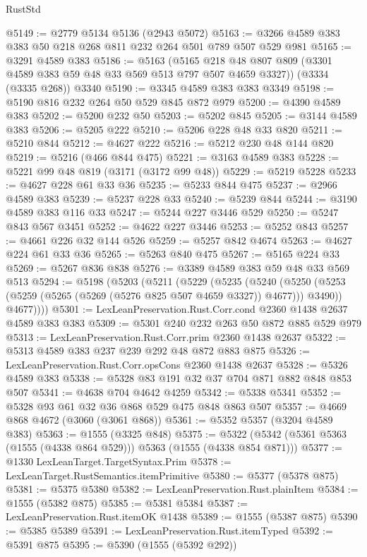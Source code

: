 \begin{lexlean}{RustStd}
\begin{coremodule}
@5149 := @2779 @5134 @5136 (@2943 @5072)
@5163 := @3266 @4589 @383 @383 @50 @218 @268 @811 @232 @264 @501 @789 @507 @529 @981
@5165 := @3291 @4589 @383
@5186 := @5163
    (@5165 @218 @48 @807 @809 (@3301 @4589 @383 @59 @48 @33 @569 @513 @797 @507 @4659 @3327))
    (@3334 (@3335 @268))
    @3340
@5190 := @3345 @4589 @383 @383 @3349
@5198 := @5190 @816 @232 @264 @50 @529 @845 @872 @979
@5200 := @4390 @4589 @383
@5202 := @5200 @232 @50
@5203 := @5202 @845
@5205 := @3144 @4589 @383
@5206 := @5205 @222
@5210 := @5206 @228 @48 @33 @820
@5211 := @5210 @844
@5212 := @4627 @222
@5216 := @5212 @230 @48 @144 @820
@5219 := @5216 (@466 @844 @475)
@5221 := @3163 @4589 @383
@5228 := @5221 @99 @48 @819 (@3171 (@3172 @99 @48))
@5229 := @5219 @5228
@5233 := @4627 @228 @61 @33 @36
@5235 := @5233 @844 @475
@5237 := @2966 @4589 @383
@5239 := @5237 @228 @33
@5240 := @5239 @844
@5244 := @3190 @4589 @383 @116 @33
@5247 := @5244 @227 @3446 @529
@5250 := @5247 @843 @567 @3451
@5252 := @4622 @227 @3446
@5253 := @5252 @843
@5257 := @4661 @226 @32 @144 @526
@5259 := @5257 @842 @4674
@5263 := @4627 @224 @61 @33 @36
@5265 := @5263 @840 @475
@5267 := @5165 @224 @33
@5269 := @5267 @836 @838
@5276 := @3389 @4589 @383 @59 @48 @33 @569 @513
@5294 := @5198
    (@5203
      (@5211
        (@5229
          (@5235
            (@5240
              (@5250 (@5253 (@5259 (@5265 (@5269 (@5276 @825 @507 @4659 @3327)) @4677))) @3490))
            @4677))))
@5301 := LexLeanPreservation.Rust.Corr.cond @2360 @1438 @2637 @4589 @383 @383
@5309 := @5301 @240 @232 @263 @50 @872 @885 @529 @979
@5313 := LexLeanPreservation.Rust.Corr.prim @2360 @1438 @2637
@5322 := @5313 @4589 @383 @237 @239 @292 @48 @872 @883 @875
@5326 := LexLeanPreservation.Rust.Corr.opsCons @2360 @1438 @2637
@5328 := @5326 @4589 @383
@5338 := @5328 @83 @191 @32 @37 @704 @871 @882 @848 @853 @507
@5341 := @4638 @704 @4642 @4259
@5342 := @5338 @5341
@5352 := @5328 @93 @61 @32 @36 @868 @529 @475 @848 @863 @507
@5357 := @4669 @868 @4672 (@3060 (@3061 @868))
@5361 := @5352 @5357 (@3204 @4589 @383)
@5363 := @1555 (@3325 @848)
@5375 := @5322 (@5342 (@5361 @5363 (@1555 (@4338 @864 @529))) @5363 (@1555 (@4338 @854 @871)))
@5377 := @1330 LexLeanTarget.TargetSyntax.Prim
@5378 := LexLeanTarget.RustSemantics.itemPrimitive
@5380 := @5377 (@5378 @875)
@5381 := @5375 @5380
@5382 := LexLeanPreservation.Rust.plainItem
@5384 := @1555 (@5382 @875)
@5385 := @5381 @5384
@5387 := LexLeanPreservation.Rust.itemOK @1438
@5389 := @1555 (@5387 @875)
@5390 := @5385 @5389
@5391 := LexLeanPreservation.Rust.itemTyped
@5392 := @5391 @875
@5395 := @5390 (@1555 (@5392 @292))

\end{coremodule}
\end{lexlean}
